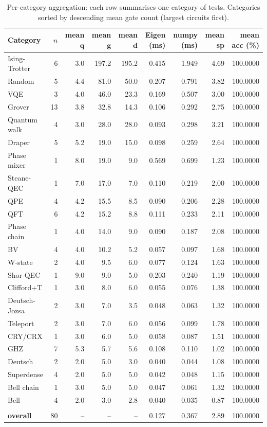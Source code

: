 \documentclass[11pt,a4paper]{article}
\begin{document}
\begin{table}[h]
\centering
\small
\setlength{\tabcolsep}{4pt}
\renewcommand{\arraystretch}{1.05}
\begin{tabular}{@{}l r r r r r r r r@{}}
\toprule
Category & $n$ & mean $\mathbf{q}$ & mean $\mathbf{g}$ & mean $\mathbf{d}$ & Eigen (ms) & numpy (ms) & mean sp & mean acc (\%) \\
\midrule[0.4pt]
Ising-Trotter & 6 & 3.0 & 197.2 & 195.2 & 0.415 & 1.949 & 4.69 & 100.0000 \\
Random & 5 & 4.4 & 81.0 & 50.0 & 0.207 & 0.791 & 3.82 & 100.0000 \\
VQE & 3 & 4.0 & 46.0 & 23.3 & 0.169 & 0.507 & 3.00 & 100.0000 \\
Grover & 13 & 3.8 & 32.8 & 14.3 & 0.106 & 0.292 & 2.75 & 100.0000 \\
Quantum walk & 4 & 3.0 & 28.0 & 28.0 & 0.093 & 0.298 & 3.21 & 100.0000 \\
Draper & 5 & 5.2 & 19.0 & 15.0 & 0.098 & 0.259 & 2.64 & 100.0000 \\
Phase mixer & 1 & 8.0 & 19.0 & 9.0 & 0.569 & 0.699 & 1.23 & 100.0000 \\
Steane-QEC & 1 & 7.0 & 17.0 & 7.0 & 0.110 & 0.219 & 2.00 & 100.0000 \\
QPE & 4 & 4.2 & 15.5 & 8.5 & 0.090 & 0.206 & 2.28 & 100.0000 \\
QFT & 6 & 4.2 & 15.2 & 8.8 & 0.111 & 0.233 & 2.11 & 100.0000 \\
Phase chain & 1 & 4.0 & 14.0 & 9.0 & 0.090 & 0.187 & 2.08 & 100.0000 \\
BV & 4 & 4.0 & 10.2 & 5.2 & 0.057 & 0.097 & 1.68 & 100.0000 \\
W-state & 2 & 4.0 & 9.5 & 6.0 & 0.077 & 0.124 & 1.63 & 100.0000 \\
Shor-QEC & 1 & 9.0 & 9.0 & 5.0 & 0.203 & 0.240 & 1.19 & 100.0000 \\
Clifford+T & 1 & 3.0 & 8.0 & 6.0 & 0.055 & 0.076 & 1.38 & 100.0000 \\
Deutsch-Jozsa & 2 & 3.0 & 7.0 & 3.5 & 0.048 & 0.063 & 1.32 & 100.0000 \\
Teleport & 2 & 3.0 & 7.0 & 6.0 & 0.056 & 0.099 & 1.78 & 100.0000 \\
CRY/CRX & 1 & 3.0 & 6.0 & 5.0 & 0.058 & 0.087 & 1.51 & 100.0000 \\
GHZ & 7 & 5.3 & 5.7 & 5.6 & 0.108 & 0.110 & 1.02 & 100.0000 \\
Deutsch & 2 & 2.0 & 5.0 & 3.0 & 0.040 & 0.044 & 1.08 & 100.0000 \\
Superdense & 4 & 2.0 & 5.0 & 5.0 & 0.042 & 0.048 & 1.15 & 100.0000 \\
Bell chain & 1 & 3.0 & 5.0 & 5.0 & 0.047 & 0.061 & 1.32 & 100.0000 \\
Bell & 4 & 2.0 & 3.0 & 2.8 & 0.040 & 0.035 & 0.87 & 100.0000 \\
\\ \midrule[0.4pt]
\textbf{overall} & 80 & -- & -- & -- & 0.127 & 0.367 & 2.89 & 100.0000 \\
\bottomrule
\end{tabular}
\caption{Per-category aggregation: each row summarises one category of tests.
Categories sorted by descending mean gate count (largest circuits first).}
\end{table}
\end{document}
